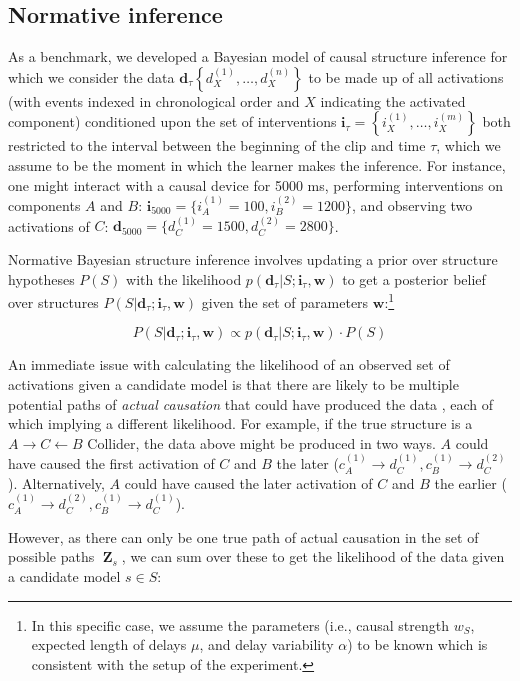 \documentclass[10pt,letterpaper]{article}
\newcommand{\ww}{\mathbf{w}} %
\newcommand{\ws}{w_S} %
\newcommand{\mm}{s} %
\newcommand{\calm}{S} %
\newcommand{\ci}{\mathbf{i}} %
\newcommand{\da}{\mathbf{d}} %
\DeclareMathOperator*{\zzz}{\mathbf{Z}} %
\begin{document}
\subsection{Normative inference}
As a benchmark, we developed a Bayesian model of causal structure inference for which we consider the data $\da_{\tau}\left\{ d_X^{(1)},\ldots, d_X^{(n)} \right\}$ to be made up of all activations (with events indexed in chronological order and $X$ indicating the activated component) conditioned upon the set of interventions $\ci_{\tau}=\left\{i_X^{(1)},\ldots, i_X^{(m)} \right\}$ both restricted to the interval between the beginning of the clip and time $\tau$, which we assume to be the moment in which the learner makes the inference.  For instance, one might interact with a causal device for 5000 ms, performing interventions on components $A$ and $B$: $\ci_{5000} = \{i_A^{(1)}=100, i_B^{(2)}=1200\}$, and observing two activations of $C$: $\da_{5000} = \{ d^{(1)}_C=1500, d^{(2)}_C=2800\}$.

Normative Bayesian structure inference involves updating a prior over structure hypotheses $P(\calm)$ with the likelihood $p(\da_{\tau}|\calm;\ci_{\tau}, \ww)$ to get a posterior belief over structures $P(\calm|\da_{\tau};\ci_{\tau}, \ww)$ given the set of parameters $\ww$:\footnote{In this specific case, we assume the parameters (i.e., causal strength $\ws$, expected length of delays $\mu$, and delay variability $\alpha$) to be known which is consistent with the setup of the experiment.}

\begin{equation}
    P(\calm|\da_{\tau};\ci_{\tau}, \ww) \propto p(\da_{\tau}|\calm;\ci_{\tau}, \ww) \cdot P(\calm)
\end{equation}

An immediate issue with calculating the likelihood of an observed set of activations given a candidate model is that there are likely to be multiple potential paths of \emph{actual causation} that could have produced the data \citep{halpern2016causality}, each of which implying a different likelihood.  For example, if the true structure is a $A\rightarrow C \leftarrow B$ Collider, the data above might be produced in two ways.  $A$ could have caused the first activation of $C$ and $B$ the later ($c_A^{(1)}\rightarrow d_C^{(1)}, c_B^{(1)}\rightarrow d_C^{(2)}$).  Alternatively, $A$ could have caused the later activation of $C$ and $B$ the earlier ($c_A^{(1)}\rightarrow d_C^{(2)}, c_B^{(1)}\rightarrow d_C^{(1)}$). 

However, as there can only be one true path of actual causation in the set of possible paths $\zzz_{\mm}$, we can sum over these to get the likelihood of the data given a candidate model $\mm\in\calm$:
\end{document}
